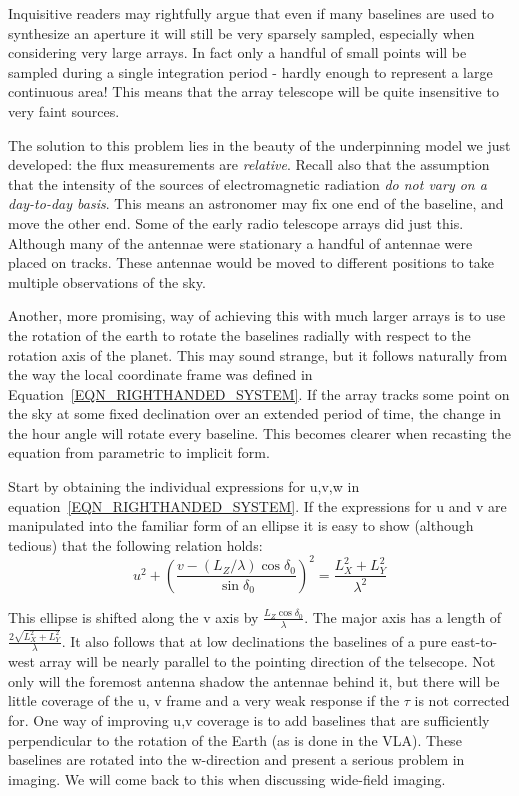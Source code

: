 Inquisitive readers may rightfully argue that even if many baselines are used to synthesize an aperture it will still be
very sparsely sampled, especially when considering very large arrays. In fact only a handful of small points will be 
sampled during a single integration period - hardly enough to represent a large continuous area! This means that 
the array telescope will be quite insensitive to very faint sources.

The solution to this problem lies in the beauty of the underpinning model we just developed: the flux measurements
are \textit{relative}. Recall also that the assumption that the intensity of the sources of electromagnetic radiation 
\textit{do not vary on a day-to-day basis}. This means an astronomer may fix one end of the baseline, and move the other
end. Some of the early radio telescope arrays did just this. Although many of the antennae were stationary a handful
of antennae were placed on tracks. These antennae would be moved to different positions to take multiple observations
of the sky.

Another, more promising, way of achieving this with much larger arrays is to use the rotation of the earth to rotate
the baselines radially with respect to the rotation axis of the planet. This may sound strange, but it 
follows naturally from the way the local coordinate frame was defined in Equation~\ref{EQN_RIGHTHANDED_SYSTEM}. If the
array tracks some point on the sky at some fixed declination over an extended period of time, the change in the hour
angle will rotate every baseline. This becomes clearer when recasting the equation from parametric to implicit form. 

Start by obtaining the individual expressions for u,v,w in equation~\ref{EQN_RIGHTHANDED_SYSTEM}. If the expressions
for u and v are manipulated into the familiar form of an ellipse it is easy to show (although tedious) that the following
relation holds:
\begin{equation*}
 u^2 + \left(\frac{v-(L_Z/\lambda)\cos{\delta_0}}{\sin{\delta_0}}\right)^2 = \frac{L_X^2 + L_Y^2}{\lambda^2}
\end{equation*}

This ellipse is shifted along the v axis by $\frac{L_Z\cos{\delta_0}}{\lambda}$. The major axis has a length of 
$\frac{2\sqrt{L_X^2 + L_Y^2}}{\lambda}$. It also follows that at low declinations the baselines 
of a pure east-to-west array will be nearly parallel to the pointing direction of the telsecope.
Not only will the foremost antenna shadow the antennae behind it, but there will be little coverage of the u, v
frame and a very weak response if the $\tau$ is not corrected for. One way of improving u,v coverage is to add baselines
that are sufficiently perpendicular to the rotation of the Earth (as is done in the VLA). These baselines are rotated into
the w-direction and present a serious problem in imaging. We will come back to this when discussing wide-field imaging.


